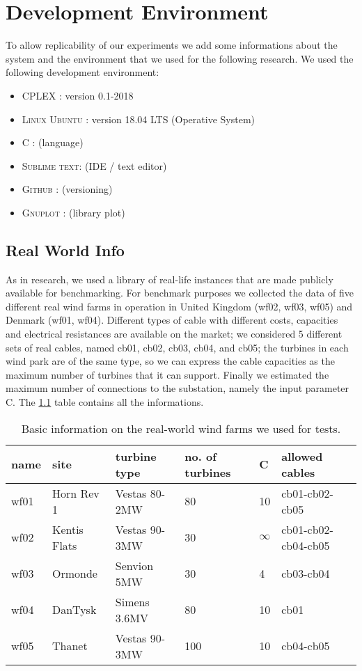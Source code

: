 
\chapter{Development Environment}
\label{chp:1-Environment}
To allow replicability of our experiments we add some informations about the system and the environment that we used for the following research. 
We used the following development environment:
\begin{itemize}
\item \textsc{CPLEX} :  version 0.1-2018
\item \textsc{Linux Ubuntu} : version 18.04 LTS (Operative System)
\item \textsc{C} :  	(language)
\item \textsc{Sublime text}: (IDE / text editor)
\item \textsc{Github} : (versioning)
\item \textsc{Gnuplot} : (library plot)
\end{itemize}

\section{Real World Info}
As in \cite{wfcp} research, we used a library of real-life instances that are made publicly available for benchmarking.
For benchmark purposes we collected the data of five different real wind farms in operation in United Kingdom (wf02, wf03, wf05) and Denmark (wf01, wf04). Different types of cable with different costs, capacities and electrical resistances are available on the market; we considered 5 different sets of real cables, named cb01, cb02, cb03, cb04, and cb05; the turbines in each wind park are of the same type, so we can express the cable capacities as the maximum number of turbines that it can support. Finally we estimated the maximum number of connections to the substation, namely the input parameter C. The \ref{tab:realWorld} table contains all the informations.
\begin{table}[!htbp]\label{tab:realWorld}
\center
\begin{tabular}{llllll}
\hline
name & site         & turbine type  & no. of turbines & C  & allowed cables      \\ \hline
wf01 & Horn Rev 1   & Vestas 80-2MW & 80              & 10 & cb01-cb02-cb05      \\
wf02 & Kentis Flats & Vestas 90-3MW & 30              & $\infty$   & cb01-cb02-cb04-cb05 \\
wf03 & Ormonde      & Senvion 5MW   & 30              & 4  & cb03-cb04           \\
wf04 & DanTysk      & Simens 3.6MV  & 80              & 10 & cb01                \\
wf05 & Thanet       & Vestas 90-3MW & 100             & 10 & cb04-cb05           \\ \hline
\end{tabular}
\caption{Basic information on the real-world wind farms we used for tests.}
\end{table}

